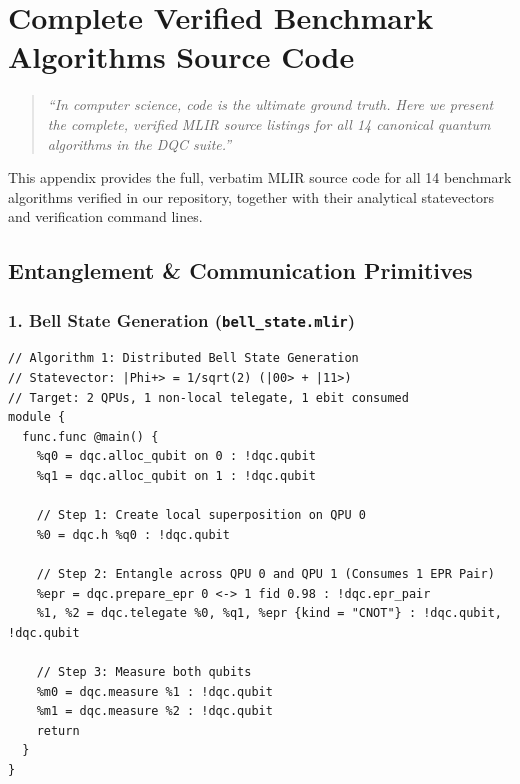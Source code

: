 \chapter{Complete Verified Benchmark Algorithms Source Code}
\label{app:benchmark_source_code}

\begin{quote}
\textit{``In computer science, code is the ultimate ground truth. Here we present the complete, verified MLIR source listings for all 14 canonical quantum algorithms in the DQC suite.''}
\end{quote}

This appendix provides the full, verbatim MLIR source code for all 14 benchmark algorithms verified in our repository, together with their analytical statevectors and verification command lines.

\section{Entanglement \& Communication Primitives}

\subsection{1. Bell State Generation (\texttt{bell\_state.mlir})}
\begin{lstlisting}[language=MLIR, caption={bell\_state.mlir}]
// Algorithm 1: Distributed Bell State Generation
// Statevector: |Phi+> = 1/sqrt(2) (|00> + |11>)
// Target: 2 QPUs, 1 non-local telegate, 1 ebit consumed
module {
  func.func @main() {
    %q0 = dqc.alloc_qubit on 0 : !dqc.qubit
    %q1 = dqc.alloc_qubit on 1 : !dqc.qubit

    // Step 1: Create local superposition on QPU 0
    %0 = dqc.h %q0 : !dqc.qubit

    // Step 2: Entangle across QPU 0 and QPU 1 (Consumes 1 EPR Pair)
    %epr = dqc.prepare_epr 0 <-> 1 fid 0.98 : !dqc.epr_pair
    %1, %2 = dqc.telegate %0, %q1, %epr {kind = "CNOT"} : !dqc.qubit, !dqc.qubit

    // Step 3: Measure both qubits
    %m0 = dqc.measure %1 : !dqc.qubit
    %m1 = dqc.measure %2 : !dqc.qubit
    return
  }
}
\end{lstlisting}

